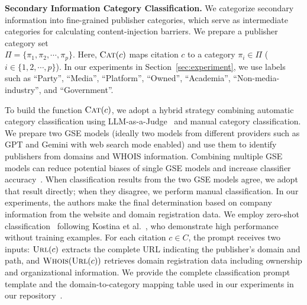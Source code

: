 \textbf{Secondary Information Category Classification.}
We categorize secondary information into fine-grained publisher categories, which serve as intermediate categories for calculating content-injection barriers.
We prepare a publisher category set \\$\Pi = \{\pi_1, \pi_2, \cdots, \pi_p\}$.
Here, $\textsc{Cat}(c)$ maps citation $c$ to a category $\pi_i \in \Pi$ ($i \in \{1, 2, \cdots, p\}$).
In our experiments in Section~\ref{sec:experiment}, we use labels such as ``Party'', ``Media'', ``Platform'', ``Owned'', ``Academia'', ``Non-media-industry'', and ``Government''.

To build the function $\textsc{Cat}(c)$, we adopt a hybrid strategy combining automatic category classification using LLM-as-a-Judge~\cite{survey-llm-as-a-judge-arxiv24,judging-llm-as-a-judge-with-mt-bench-and-chatbot-arena-arxiv23} and manual category classification.
We prepare two GSE models (ideally two models from different providers such as GPT and Gemini with web search mode enabled) and use them to identify publishers from domains and WHOIS information.
Combining multiple GSE models can reduce potential biases of single GSE models and increase classifier accuracy~\cite{judging-llm-as-a-judge-with-mt-bench-and-chatbot-arena-arxiv23}.
When classification results from the two GSE models agree, we adopt that result directly; when they disagree, we perform manual classification.
In our experiments, the authors make the final determination based on company information from the website and domain registration data.
We employ zero-shot classification~\cite{radford2019language} following Kostina et al.~\cite{kostina2025largelanguagemodelstext}, who demonstrate high performance without training examples.
For each citation $c \in C$, the prompt receives two inputs: $\textsc{Url}(c)$ extracts the complete URL indicating the publisher's domain and path, and $\textsc{Whois}(\textsc{Url}(c))$ retrieves domain registration data including ownership and organizational information.
We provide the complete classification prompt template and the domain-to-category mapping table used in our experiments in our repository~\cite{QL_CIKM_RERO}.

